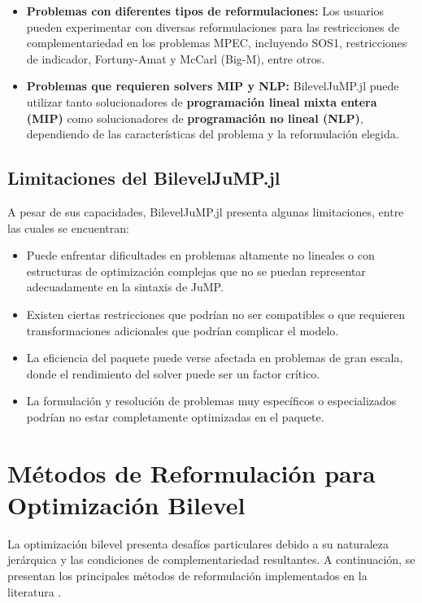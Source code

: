 \begin{itemize}
    \item \textbf{Problemas con diferentes tipos de reformulaciones:} Los usuarios pueden experimentar con diversas reformulaciones para las restricciones de complementariedad en los problemas MPEC, incluyendo SOS1, restricciones de indicador, Fortuny-Amat y McCarl (Big-M), entre otros.
    
    \item \textbf{Problemas que requieren solvers MIP y NLP:} BilevelJuMP.jl puede utilizar tanto solucionadores de \textbf{programación lineal mixta entera (MIP)} como solucionadores de \textbf{programación no lineal (NLP)}, dependiendo de las características del problema y la reformulación elegida.
\end{itemize}

\subsection{Limitaciones del BilevelJuMP.jl}

A pesar de sus capacidades, BilevelJuMP.jl presenta algunas limitaciones, entre las cuales se encuentran:

\begin{itemize}
    \item Puede enfrentar dificultades en problemas altamente no lineales o con estructuras de optimización complejas que no se puedan representar adecuadamente en la sintaxis de JuMP.
    \item Existen ciertas restricciones que podrían no ser compatibles o que requieren transformaciones adicionales que podrían complicar el modelo.
    \item La eficiencia del paquete puede verse afectada en problemas de gran escala, donde el rendimiento del solver puede ser un factor crítico.
    \item La formulación y resolución de problemas muy específicos o especializados podrían no estar completamente optimizadas en el paquete.
\end{itemize}


\section{Métodos de Reformulación para Optimización Bilevel}

La optimización bilevel presenta desafíos particulares debido a su naturaleza jerárquica y las condiciones de complementariedad resultantes. A continuación, se presentan los principales métodos de reformulación implementados en la literatura \cite{BilevelJump}.

